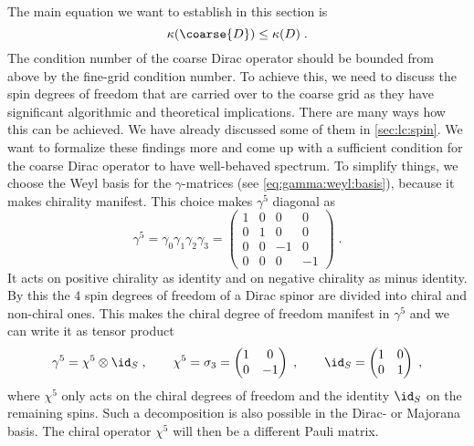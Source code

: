 The main equation we want to establish in this section is
\begin{equation}
\kappa(\coarse{D}) \leq \kappa(D) \;.
\end{equation}
The condition number of the coarse Dirac operator should be bounded from above by the fine-grid condition number.
To achieve this, we need to discuss the spin degrees of freedom that are carried over to the coarse grid as they have significant algorithmic and theoretical implications.
There are many ways how this can be achieved.
We have already discussed some of them in \cref{sec:lc:spin}.
We want to formalize these findings more and come up with a sufficient condition for the coarse Dirac operator to have well-behaved spectrum.
To simplify things, we choose the Weyl basis for the $\gamma$-matrices (see \cref{eq:gamma:weyl:basis}), because it makes chirality manifest.
This choice makes $\gamma^5$ diagonal as
\begin{equation}
\gamma^5 =
\gamma_0 \gamma_1 \gamma_2 \gamma_3 =
\begin{pmatrix}
1 & 0 & 0 & 0 \\
0 & 1 & 0 & 0 \\
0 & 0 & -1 & 0 \\
0 & 0 & 0 & -1
\end{pmatrix} \;.
\end{equation}
It acts on positive chirality as identity and on negative chirality as minus identity.
By this the \num{4} spin degrees of freedom of a Dirac spinor are divided into chiral and non-chiral ones.
This makes the chiral degree of freedom manifest in $\gamma^5$ and we can write it as tensor product
\begin{equation} \label{eq:strict:separable}
\gamma^5 = \chi^5 \otimes \id_S \;,
\qquad
\chi^5 = 
\sigma_3 = 
\begin{pmatrix}
1 & 0 \\
0 & -1
\end{pmatrix} \;,
\qquad
\id_S = 
\begin{pmatrix}
1 & 0 \\
0 & 1
\end{pmatrix} \;,
\end{equation}
where $\chi^5$ only acts on the chiral degrees of freedom and the identity $\id_S$ on the remaining spins.
Such a decomposition is also possible in the Dirac- or Majorana basis.
The chiral operator $\chi^5$ will then be a different Pauli matrix.

